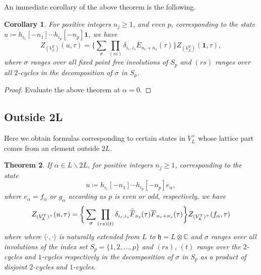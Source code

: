 \documentclass[pdftex]{sigma}
\numberwithin{equation}{section}
\newtheorem{Theorem}{Theorem}[section]
\newtheorem{Corollary}[Theorem]{Corollary}
\theoremstyle{definition}
\begin{document}
An immediate corollary of the above theorem is the following.

\begin{Corollary}\label{corollary1}
 For positive integers $n_j\geq 1$, and even $p$, corresponding to the state
$
u\coloneqq h_{i_1}[-n_1]\cdots h_{i_p}[-n_p]\mathbf{1}$,
 we have
 \[Z_{(V_L^T)}(u,\tau)=\bigg\{\sum_{\sigma}\prod_{(rs)}\delta_{i_r,i_s}\overline{E}_{n_r+n_s}(\tau)\bigg\}Z_{(V_L^T)}(\mathbf{1},\tau),\]
 where $\sigma$ ranges over all fixed point free involutions of $S_p$ and $(rs)$ ranges over all $2$-cycles in the decomposition of $\sigma$ in $S_p$.
\end{Corollary}

\begin{proof}
 Evaluate the above theorem at $\alpha=0$.
\end{proof}

\subsection{Outside 2L}

Here we obtain formulas corresponding to certain states in $V_L^+$ whose lattice part comes from an element outside $2L$.

\begin{Theorem}\label{Outside 2L}
 If $\alpha\in L\backslash 2L$, for positive integers $n_j\geq 1$, corresponding to the state
 \[u\coloneqq h_{i_1}[-n_1]\cdots h_{i_p}[-n_p]e_{\alpha},\]
 where $e_{\alpha}=f_{\alpha}$ or $g_{\alpha}$ according as $p$ is even or odd, respectively, we have
 \[Z_{(V_L^T)^+}(u,\tau)=\bigg\{\sum_{\sigma} \prod_{(rs)(t)}\delta_{i_r,i_s}\Tilde{\overline{F}}_{n_t}(\tau)\overline{F}_{n_r+n_s}(\tau)\bigg\}Z_{(V_L^T)^+}(f_{\alpha},\tau)\]
 where
 where $\langle \cdot,\cdot \rangle$ is naturally extended from $L$ to $\mathfrak{h}=L\otimes \mathbb{C}$ and $\sigma$ ranges over all involutions of the index set $S_p=\{1,2,\dots, p\}$ and $(rs)$, $(t)$ range over the $2$-cycles and $1$-cycles respectively in the decomposition of $\sigma$ in $S_p$ as a product of disjoint $2$-cycles and $1$-cycles.
\end{Theorem}
\end{document}
